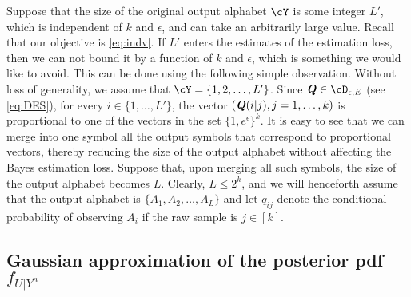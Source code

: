 \documentclass[11pt,onecolumn]{IEEEtran}
\def\mathbi#1{{\textbf{\textit #1}}}
\begin{document}
Suppose that the size of the original output alphabet $\cY$ is some integer $L'$, which is independent of $k$ and $\epsilon$, and can take an arbitrarily large value.
Recall that our objective is \eqref{eq:indv}.
 If $L'$ enters the estimates of the estimation loss, then we can not bound it by a function of $k$ and $\epsilon$, which
is something we would like to avoid. This can be done using the following simple observation.
Without loss of generality, we assume that $\cY = \{1,2,\dots,L'\}$.
Since $\mathbi{Q}\in \cD_{\epsilon,E}$ (see \eqref{eq:DES}), for every $i\in\{1,\dots,L'\}$,
the vector $(\mathbi{Q}(i|j),j=1,\dots,k)$ is proportional to one of the vectors in the set $\{1,e^\epsilon\}^k$. 
It is easy to see that we can merge into one symbol all the output symbols that correspond to proportional vectors, thereby
reducing the size of the output alphabet without affecting the Bayes estimation loss. Suppose that, upon merging all
such symbols, the size of the output alphabet becomes $L$. Clearly, $L\le 2^k$, and we will henceforth assume that
the output alphabet is $\{A_1,A_2,\dots,A_L\}$ and let $q_{ij}$ denote the conditional probability of observing $A_i$ if the raw sample is $j\in[k]$. 


\subsection{Gaussian approximation of the posterior pdf $f_{U|Y^n}$}
\end{document}
